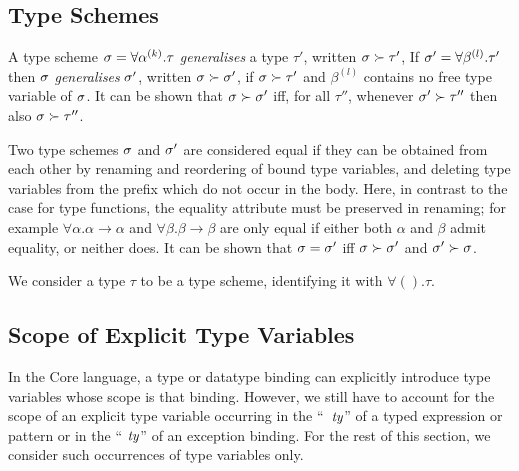\subsection{Type Schemes}
\label{type-scheme-sec}
A type scheme $\sigma=\forall\mbox{$\alpha^{(k)}$}.\tau$
 {\sl generalises} a type $\tau'$,
written $\sigma \succ\tau'$,
If $\sigma'=\forall\beta^{(l)}.\tau'$ then $\sigma$ {\sl generalises} $\sigma'$,
written $\sigma\succ\sigma'$, if $\sigma\succ\tau'$ and $\beta^{(l)}$ contains
no free type variable of $\sigma$.
It can be shown that $\sigma\succ\sigma'$ iff, for all $\tau''$, whenever
$\sigma'\succ\tau''$ then also $\sigma\succ\tau''$.

Two type schemes $\sigma$ and $\sigma'$ are considered equal
if they can be obtained from each other by
renaming and reordering of bound type variables, and deleting type
variables from the prefix which do not occur in the body.
Here, in contrast to the case for type functions, the equality attribute
must be preserved in renaming; for example $\forall\alpha.\alpha\to\alpha$
and $\forall\beta.\beta\to\beta$ are only equal if either both $\alpha$
and $\beta$ admit equality, or neither does.
It can be shown that $\sigma=\sigma'$ iff $\sigma\succ\sigma'$ and
$\sigma'\succ\sigma$.

We consider a type $\tau$ to be a type scheme, identifying it with
$\forall().\tau$.
\oldpagebreak

\subsection{Scope of Explicit Type Variables}
\label{scope-sec}

In the Core language, a type or datatype binding can
explicitly introduce type variables whose scope is that binding.
 However,  we still have to account for the
scope of an explicit type variable occurring in the ``\ml{:}~${\it ty}$''
of a typed expression or pattern
or in the `` ${\it ty}$'' of an exception binding. For the rest
of this section, we consider such  occurrences of type variables only.

